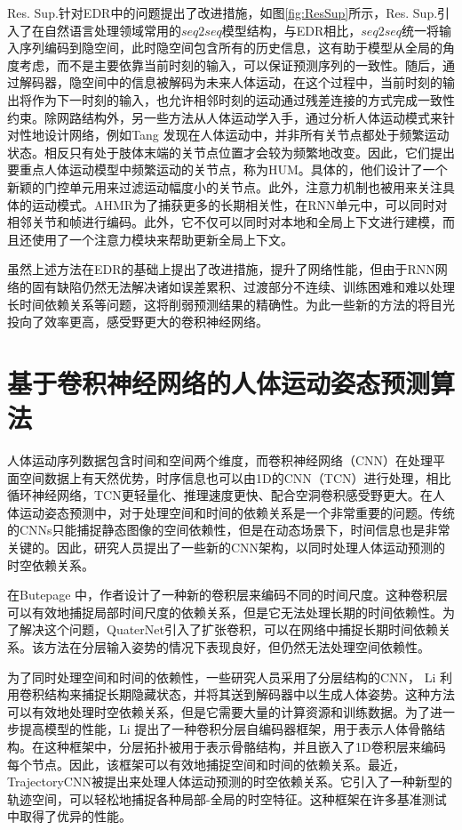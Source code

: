 Res. Sup.\parencite{martinez2017human}针对EDR中的问题提出了改进措施，如图\ref{fig:ResSup}所示，Res. Sup.引入了在自然语言处理领域常用的$seq2seq$模型结构，与EDR相比，$seq2seq$统一将输入序列编码到隐空间，此时隐空间包含所有的历史信息，这有助于模型从全局的角度考虑，而不是主要依靠当前时刻的输入，可以保证预测序列的一致性。随后，通过解码器，隐空间中的信息被解码为未来人体运动，在这个过程中，当前时刻的输出将作为下一时刻的输入，也允许相邻时刻的运动通过残差连接的方式完成一致性约束。除网路结构外，另一些方法从人体运动学入手，通过分析人体运动模式来针对性地设计网络，例如Tang \etal \parencite{tang2018long}发现在人体运动中，并非所有关节点都处于频繁运动状态。相反只有处于肢体末端的关节点位置才会较为频繁地改变。因此，它们提出要重点人体运动模型中频繁运动的关节点，称为HUM。具体的，他们设计了一个新颖的门控单元用来过滤运动幅度小的关节点。此外，注意力机制也被用来关注具体的运动模式。AHMR\parencite{liu2022investigating}为了捕获更多的长期相关性，在RNN单元中，可以同时对相邻关节和帧进行编码。此外，它不仅可以同时对本地和全局上下文进行建模，而且还使用了一个注意力模块来帮助更新全局上下文。

虽然上述方法在EDR的基础上提出了改进措施，提升了网络性能，但由于RNN网络的固有缺陷仍然无法解决诸如误差累积、过渡部分不连续、训练困难和难以处理长时间依赖关系等问题，这将削弱预测结果的精确性。为此一些新的方法的将目光投向了效率更高，感受野更大的卷积神经网络。

\section{基于卷积神经网络的人体运动姿态预测算法}
人体运动序列数据包含时间和空间两个维度，而卷积神经网络（CNN）在处理平面空间数据上有天然优势，时序信息也可以由1D的CNN（TCN\cite{oord2016wavenet}）进行处理，相比循环神经网络，TCN更轻量化、推理速度更快、配合空洞卷积\cite{yu2017dilated}感受野更大。在人体运动姿态预测中，对于处理空间和时间的依赖关系是一个非常重要的问题。传统的CNNs只能捕捉静态图像的空间依赖性，但是在动态场景下，时间信息也是非常关键的。因此，研究人员提出了一些新的CNN架构，以同时处理人体运动预测的时空依赖关系。

在Butepage \etal \parencite{butepage2017deep}中，作者设计了一种新的卷积层来编码不同的时间尺度。这种卷积层可以有效地捕捉局部时间尺度的依赖关系，但是它无法处理长期的时间依赖性。为了解决这个问题，QuaterNet\parencite{pavllo2018quaternet}引入了扩张卷积，可以在网络中捕捉长期时间依赖关系。该方法在分层输入姿势的情况下表现良好，但仍然无法处理空间依赖性。

为了同时处理空间和时间的依赖性，一些研究人员采用了分层结构的CNN， Li \etal \parencite{li2018convolutional}利用卷积结构来捕捉长期隐藏状态，并将其送到解码器中以生成人体姿势。这种方法可以有效地处理时空依赖关系，但是它需要大量的计算资源和训练数据。为了进一步提高模型的性能，Li \etal \parencite{li2019efficient}提出了一种卷积分层自编码器框架，用于表示人体骨骼结构。在这种框架中，分层拓扑被用于表示骨骼结构，并且嵌入了1D卷积层来编码每个节点。因此，该框架可以有效地捕捉空间和时间的依赖关系。最近，TrajectoryCNN\parencite{liu2020trajectorycnn}被提出来处理人体运动预测的时空依赖关系。它引入了一种新型的轨迹空间，可以轻松地捕捉各种局部-全局的时空特征。这种框架在许多基准测试中取得了优异的性能。

